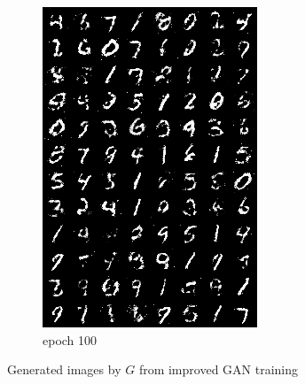 \documentclass[a4paper]{article}
\theoremstyle{definition}
\newenvironment{soln}{
	\leavevmode\color{blue}\ignorespaces
}{}
\begin{document}
\begin{enumerate} [label=(\alph*)]
\begin{soln}
\begin{soln}
\begin{figure}[H]
\begin{subfigure}[b]{0.3\textwidth}
						\includegraphics[width=\textwidth]{../outputs-c-nadm-smooth/gen_img100.png}
						\caption{epoch 100}
					\end{subfigure}
					\caption{Generated images by $G$ from improved GAN training}
					\label{fig:three graphs}
				\end{figure}
			\end{soln}
		\end{soln}
		
	\end{enumerate}
\end{document}
